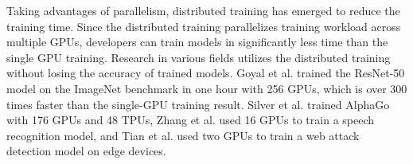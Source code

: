 Taking advantages of parallelism, distributed training has emerged to reduce
the training time. 
Since the distributed training parallelizes training workload across multiple
GPUs, developers can train models in significantly less time than the single
GPU training.
Research in various fields utilizes the distributed training without losing
the accuracy of trained models.
Goyal et al.\cite{facebook2018} trained the ResNet-50 model on the ImageNet
benchmark in one hour with 256 GPUs, which is over 300 times faster than the
single-GPU training result.
Silver et al.\cite{Silver2017alphagozero} trained AlphaGo with 176
GPUs and 48 TPUs, Zhang et al.\cite{zhang2019distrspeech} used 16 GPUs to train
a speech recognition model, and Tian et al.\cite{tian2020distrwebattack} used
two GPUs to train a web attack detection model on edge devices.




